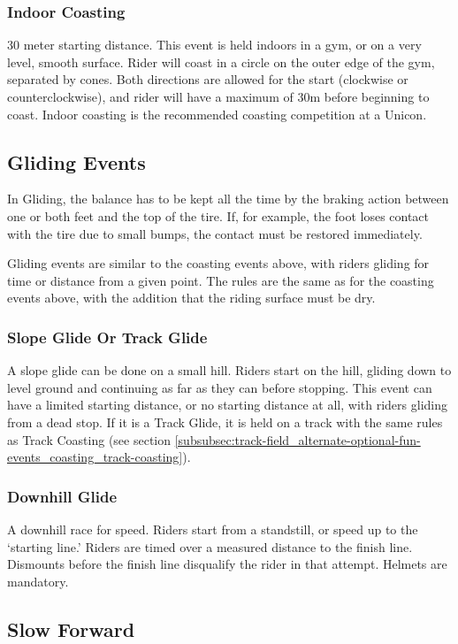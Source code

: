 \subsubsection{Indoor Coasting}
30 meter starting distance.
This event is held indoors in a gym, or on a very level, smooth surface.
Rider will coast in a circle on the outer edge of the gym, separated by cones.
Both directions are allowed for the start (clockwise or counterclockwise), and rider will have a maximum of 30m before beginning to coast.
Indoor coasting is the recommended coasting competition at a Unicon.

\subsection{Gliding Events}

In Gliding, the balance has to be kept all the time by the braking action between one or both feet and the top of the tire.
If, for example, the foot loses contact with the tire due to small bumps, the contact must be restored immediately.

Gliding events are similar to the coasting events above, with riders gliding for time or distance from a given point.
The rules are the same as for the coasting events above, with the addition that the riding surface must be dry.

\subsubsection{Slope Glide Or Track Glide}
A slope glide can be done on a small hill.
Riders start on the hill, gliding down to level ground and continuing as far as they can before stopping.
This event can have a limited starting distance, or no starting distance at all, with riders gliding from a dead stop.
If it is a Track Glide, it is held on a track with the same rules as Track Coasting (see section \ref{subsubsec:track-field_alternate-optional-fun-events_coasting_track-coasting}).

\subsubsection{Downhill Glide}
A downhill race for speed.
Riders start from a standstill, or speed up to the `starting line.'
Riders are timed over a measured distance to the finish line.
Dismounts before the finish line disqualify the rider in that attempt.
Helmets are mandatory.

\subsection{Slow Forward}

